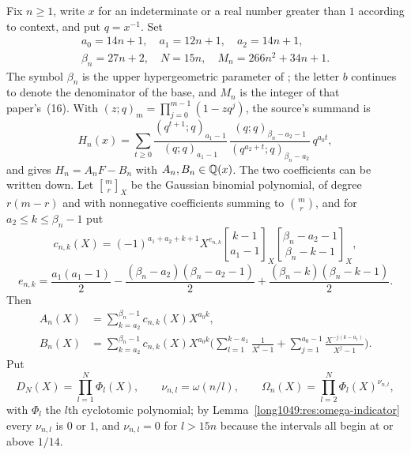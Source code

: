 \documentclass[11pt]{article}
\begin{document}
Fix $n\ge1$, write $x$ for an indeterminate or a real number greater than $1$
according to context, and put $q=x^{-1}$.  Set
\[
\begin{gathered}
 a_0=14n+1,\quad a_1=12n+1,\quad a_2=14n+1,\\
 \beta_n=27n+2,\quad N=15n,\quad M_n=266n^{2}+34n+1 .
\end{gathered}
\]
The symbol $\beta_n$ is the upper hypergeometric parameter of
\cite[Sec.~2]{zudilin2004}; the letter $b$ continues to denote the denominator
of the base, and $M_n$ is the integer of that paper's~(16).  With
$(z;q)_m=\prod_{j=0}^{m-1}(1-zq^{j})$, the source's summand is
\begin{equation}\label{long1049:eq:positive-source-form}
 H_n(x)=\sum_{t\ge0}
 \frac{(q^{t+1};q)_{a_1-1}}{(q;q)_{a_1-1}}\,
 \frac{(q;q)_{\beta_n-a_2-1}}{(q^{a_2+t};q)_{\beta_n-a_2}}\,q^{a_0t},
\end{equation}
and \cite[(8)--(11)]{zudilin2004} gives $H_n=A_nF-B_n$ with
$A_n,B_n\in\mathbb{Q}(x)$.  The two coefficients can be written down.  Let
$\genfrac{[}{]}{0pt}{}{m}{r}_X$ be the Gaussian binomial polynomial, of degree
$r(m-r)$ and with nonnegative coefficients summing to $\binom{m}{r}$, and for
$a_2\le k\le\beta_n-1$ put
\begin{equation}\label{long1049:eq:c-explicit}
 c_{n,k}(X)=(-1)^{a_1+a_2+k+1}X^{e_{n,k}}
 \genfrac{[}{]}{0pt}{}{k-1}{a_1-1}_X
 \genfrac{[}{]}{0pt}{}{\beta_n-a_2-1}{\beta_n-k-1}_X,
\end{equation}
\[
 e_{n,k}=\frac{a_1(a_1-1)}2-\frac{(\beta_n-a_2)(\beta_n-a_2-1)}2
 +\frac{(\beta_n-k)(\beta_n-k-1)}2 .
\]
Then
\begin{align}
 A_n(X)&=\sum_{k=a_2}^{\beta_n-1}c_{n,k}(X)X^{a_0k},\label{long1049:eq:A-explicit}\\
 B_n(X)&=\sum_{k=a_2}^{\beta_n-1}c_{n,k}(X)X^{a_0k}
 \biggl(\sum_{l=1}^{k-a_1}\frac1{X^{l}-1}
 +\sum_{j=1}^{a_0-1}\frac{X^{-j(k-a_1)}}{X^{j}-1}\biggr).\label{long1049:eq:B-explicit}
\end{align}
Put
\begin{equation}\label{long1049:eq:cyclotomic-products}
 D_N(X)=\prod_{l=1}^{N}\Phi_l(X),\qquad
 \nu_{n,l}=\omega(n/l),\qquad
 \Omega_n(X)=\prod_{l=2}^{N}\Phi_l(X)^{\nu_{n,l}},
\end{equation}
with $\Phi_l$ the $l$th cyclotomic polynomial; by
Lemma~\ref{long1049:res:omega-indicator} every $\nu_{n,l}$ is $0$ or $1$, and
$\nu_{n,l}=0$ for $l>15n$ because the intervals all begin at or above $1/14$.
\end{document}
